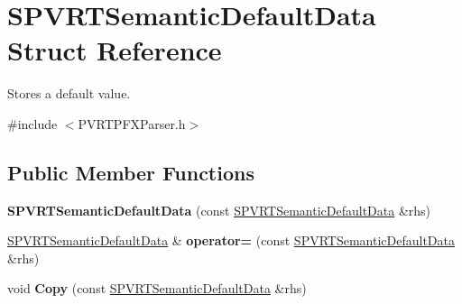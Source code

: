 \hypertarget{struct_s_p_v_r_t_semantic_default_data}{\section{S\+P\+V\+R\+T\+Semantic\+Default\+Data Struct Reference}
\label{struct_s_p_v_r_t_semantic_default_data}
}


Stores a default value.  




{\ttfamily \#include $<$P\+V\+R\+T\+P\+F\+X\+Parser.\+h$>$}

\subsection*{Public Member Functions}
\begin{DoxyCompactItemize}
\item 
\hypertarget{struct_s_p_v_r_t_semantic_default_data_af51cb986af36de3b879f6cea19f13ef2}{{\bfseries S\+P\+V\+R\+T\+Semantic\+Default\+Data} (const \hyperlink{struct_s_p_v_r_t_semantic_default_data}{S\+P\+V\+R\+T\+Semantic\+Default\+Data} \&rhs)}\label{struct_s_p_v_r_t_semantic_default_data_af51cb986af36de3b879f6cea19f13ef2}

\item 
\hypertarget{struct_s_p_v_r_t_semantic_default_data_aebef1cc9308e4a1641871330fa61cf39}{\hyperlink{struct_s_p_v_r_t_semantic_default_data}{S\+P\+V\+R\+T\+Semantic\+Default\+Data} \& {\bfseries operator=} (const \hyperlink{struct_s_p_v_r_t_semantic_default_data}{S\+P\+V\+R\+T\+Semantic\+Default\+Data} \&rhs)}\label{struct_s_p_v_r_t_semantic_default_data_aebef1cc9308e4a1641871330fa61cf39}

\item 
\hypertarget{struct_s_p_v_r_t_semantic_default_data_a254f125722f9b05f2716c9a5c9633d2c}{void {\bfseries Copy} (const \hyperlink{struct_s_p_v_r_t_semantic_default_data}{S\+P\+V\+R\+T\+Semantic\+Default\+Data} \&rhs)}\label{struct_s_p_v_r_t_semantic_default_data_a254f125722f9b05f2716c9a5c9633d2c}

\end{DoxyCompactItemize}
